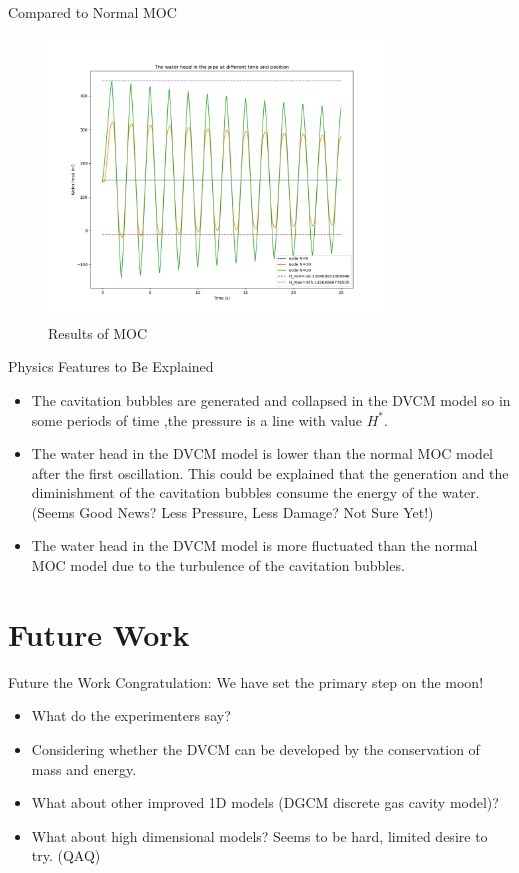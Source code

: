 \documentclass[UTF8]{ctexbeamer}
\begin{document}
\begin{frame}{Compared to Normal MOC}
    \begin{figure}
        \centering
        \includegraphics[width=0.8\textwidth]{pic/MOC_Waterhead.png}
        \caption{Results of MOC}
    \end{figure}
\end{frame}

\begin{frame}{Physics Features to Be Explained}
    \begin{itemize}
        \item The cavitation bubbles are generated and collapsed in the DVCM model so in some periods of time ,the pressure is a line with value $H^*$.
        \item The water head in the DVCM model is lower than the normal MOC model after the first oscillation. This could be explained that the generation and the diminishment of the cavitation bubbles consume the energy of the water.\\
        (Seems Good News? Less Pressure, Less Damage? Not Sure Yet!)
        \item The water head in the DVCM model is more fluctuated than the normal MOC model due to the turbulence of the cavitation bubbles.
    \end{itemize}
\end{frame}

\section{Future Work}

\begin{frame}{Future the Work}
    Congratulation: We have set the primary step on the moon!
    \begin{itemize}
        \item What do the experimenters say?
        \item Considering whether the DVCM can be developed by the conservation of mass and energy.
        \item What about other improved 1D models (DGCM discrete gas cavity model)?
        \item What about high dimensional models? Seems to be hard, limited desire to try. (QAQ)
    \end{itemize}
\end{frame}
\end{document}

